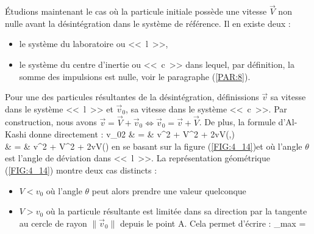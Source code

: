 \'Etudions maintenant le cas o\`u la particule initiale poss\`ede une vitesse $\vec{V}$ non nulle avant la d\'esint\'egration dans le syst\`eme de r\'ef\'erence. Il en existe deux :
\begin{itemize}
	\item le syst\`eme du laboratoire ou <<~l~>>,
	\item le syst\`eme du centre d'inertie ou <<~c~>> dans lequel, par d\'efinition, la somme des impulsions est nulle, voir le paragraphe (\ref{PAR:8}).
\end{itemize}
Pour une des particules r\'esultantes de la d\'esint\'egration, d\'efinissions $\vec{v}$ sa vitesse dans le syst\`eme <<~l~>> et $\vec{v}_{0}$, sa vitesse dans le syst\`eme <<~c~>>. Par construction, nous avons $\vec{v} = \vec{V} + \vec{v}_{0} \Leftrightarrow \vec{v}_{0} = \vec{v} + \vec{V}$. De plus, la formule d'Al-Kashi donne directement :
\bea
	v_{0}{2} & = & v^{2} + V^{2} + 2vV\cos(\langle {},\rangle) \nonumber \\
	& = & v^{2} + V^{2} + 2vV\cos(\theta)
\eea
en se basant sur la figure (\ref{FIG:4_14})et o\`u l'angle $\theta$ est l'angle de d\'eviation dans <<~l~>>. La repr\'esentation g\'eom\'etrique (\ref{FIG:4_14}) montre deux cas distincts :
\begin{itemize}
	\item $V < v_{0}$ o\`u l'angle $\theta$ peut alors prendre une valeur quelconque
	\item $V > v_{0}$ o\`u la particule r\'esultante est limit\'ee dans sa direction par la tangente au cercle de rayon $\lVert \vec{v}_{0} \rVert$ depuis le point A. Cela permet d'\'ecrire :
	\be
		\sin\theta_{max} =  \label{EQ:16_4}
	\ee
\end{itemize}

